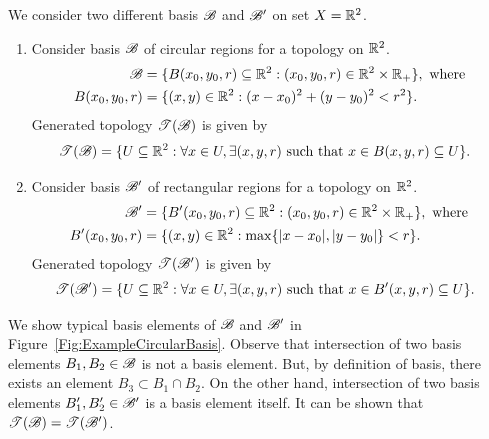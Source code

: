\documentclass[a4paper,english,12pt]{article}   	%
\begin{document}
\begin{exmp} We consider two different basis $\mathscr{B}$ and $\mathscr{B}'$ on set $X = \mathbb{R}^2$.
\begin{enumerate} 
	\item Consider basis $\mathscr{B}$ of circular regions for a topology on $\mathbb{R}^2$.
	\begin{align*}
		\mathscr{B} &= \{B(x_0,y_0,r) \subseteq \mathbb{R}^2: (x_0,y_0,r) \in \mathbb{R}^2 \times \mathbb{R}_+ \}, \text { where }\\
		B(x_0, y_0, r) &= \{ (x,y) \in \mathbb{R}^2: (x-x_0)^2 + (y-y_0)^2 < r^2\}.
	\end{align*}
	Generated topology $\mathscr{T}(\mathscr{B})$ is given by
	\begin{align*}
		\mathscr{T}(\mathscr{B}) &= \{U \subseteq \mathbb{R}^2: \forall x \in U, \exists (x,y,r) \text{ such that } x \in B(x, y, r) \subseteq U \}.
	\end{align*}	
	\item Consider basis $\mathscr{B}'$ of rectangular regions for a topology on $\mathbb{R}^2$.
	\begin{align*}
		\mathscr{B}' &= \{B'(x_0,y_0,r) \subseteq \mathbb{R}^2: (x_0,y_0,r) \in \mathbb{R}^2 \times \mathbb{R}_+ \}, \text { where }\\
		B'(x_0, y_0, r) &= \{ (x,y) \in \mathbb{R}^2: \max\{\lvert x-x_0\rvert, \lvert y-y_0\rvert\} < r\}.
	\end{align*}
	Generated topology $\mathscr{T}(\mathscr{B}')$ is given by
	\begin{align*}
		\mathscr{T}(\mathscr{B}') &= \{U \subseteq \mathbb{R}^2: \forall x \in U, \exists (x,y,r) \text{ such that } x \in B'(x, y, r) \subseteq U \}.
	\end{align*}		
\end{enumerate}
 We show typical basis elements of $\mathscr{B}$ and $\mathscr{B}'$ in Figure~\ref{Fig:ExampleCircularBasis}. Observe that intersection of two basis elements $B_1, B_2 \in \mathscr{B}$ is not a basis element. But, by definition of basis, there exists an element $B_3 \subset B_1 \cap B_2$. 
On the other hand, intersection of two basis elements $B'_1, B'_2 \in \mathscr{B}'$ is a basis element itself. It can be shown that $\mathscr{T}(\mathscr{B}) = \mathscr{T}(\mathscr{B}')$.
\end{exmp}
\end{document}

